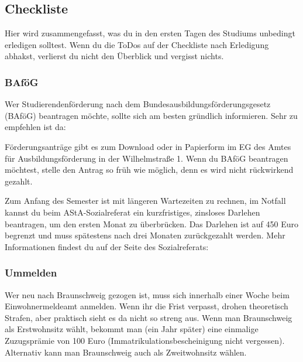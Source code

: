 
\subsection{Checkliste}
\label{checkliste}
	Hier wird zusammengefasst, was du in den ersten Tagen des Studiums unbedingt erledigen solltest. Wenn du die ToDos auf der Checkliste nach Erledigung abhakst, verlierst du nicht den Überblick und vergisst nichts.
	
\vspace*{0.5cm}


\begin{multicols}{2}

\subsubsection{BAföG}
	\label{todobafoeg}

	Wer Studierendenförderung nach dem Bundesausbildungsförderungsgesetz (BAföG) beantragen möchte, sollte sich am besten gründlich informieren. Sehr zu empfehlen ist da: \\
 
	Förderungsanträge gibt es zum Download oder in Papierform im EG des Amtes für Ausbildungsförderung in der Wilhelmstraße 1. Wenn du BAföG beantragen möchtest, stelle den Antrag so früh wie möglich, denn es wird nicht rückwirkend gezahlt.

	Zum Anfang des Semester ist mit längeren Wartezeiten zu rechnen, im Notfall kannst du beim AStA-Sozialreferat ein kurzfristiges, zinsloses Darlehen beantragen, um den ersten Monat zu überbrücken. Das Darlehen ist auf 450 Euro begrenzt und muss spätestens nach drei Monaten zurückgezahlt werden. Mehr Informationen findest du auf der Seite des Sozialreferats: 


\subsubsection{Ummelden}
	\label{todoummelden}

	Wer neu nach Braunschweig gezogen ist, muss sich innerhalb einer Woche beim Einwohnermeldeamt anmelden. Wenn ihr die Frist verpasst, drohen theoretisch Strafen, aber praktisch sieht es da nicht so streng aus. Wenn man Braunschweig als Erstwohnsitz wählt, bekommt man (ein Jahr später) eine einmalige Zuzugsprämie von 100 Euro (Immatrikulationsbescheinigung nicht vergessen). Alternativ kann man Braunschweig auch als Zweitwohnsitz wählen.


\end{multicols}
